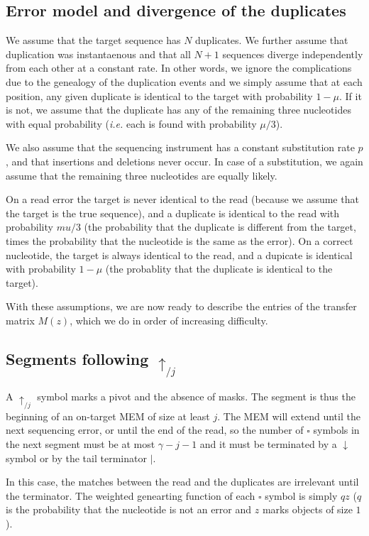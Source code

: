 \documentclass{article}
\begin{document}
\subsection{Error model and divergence of the duplicates}

We assume that the target sequence has $N$ duplicates. We further assume
that duplication was instantaenous and that all $N+1$ sequences diverge
independently from each other at a constant rate. In other words, we
ignore the complications due to the genealogy of the duplication events
and we simply assume that at each position, any given duplicate is
identical to the target with probability $1-\mu$. If it is not, we
assume that the duplicate has any of the remaining three nucleotides with
equal probability (\textit{i.e.} each is found with probability $\mu/3$).

We also assume that the sequencing instrument has a constant substitution
rate $p$, and that insertions and deletions never occur. In case of a
substitution, we again assume that the remaining three nucleotides are
equally likely.

On a read error the target is never identical to the read (because we
assume that the target is the true sequence), and a duplicate is identical
to the read with probability $mu/3$ (the probability that the duplicate is
different from the target, times the probability that the nucleotide is
the same as the error). On a correct nucleotide, the target is always
identical to the read, and a dupicate is identical with probability
$1-\mu$ (the probablity that the duplicate is identical to the target).

With these assumptions, we are now ready to describe the entries of the
transfer matrix $M(z)$, which we do in order of increasing difficulty.


\subsection{Segments following $\uparrow_{/j}$}

A $\uparrow_{/j}$ symbol marks a pivot and the absence of masks. The
segment is thus the beginning of an on-target MEM of size at least $j$.
The MEM will extend until the next sequencing error, or until the end of
the read, so the number of $\square$ symbols in the next segment must be
at most $\gamma-j-1$ and it must be terminated by a $\downarrow$ symbol or
by the tail terminator $|$.

In this case, the matches between the read and the duplicates are
irrelevant until the terminator. The weighted genearting function of each
$\square$ symbol is simply $qz$ ($q$ is the probability that the
nucleotide is not an error and $z$ marks objects of size $1$).
\end{document}
